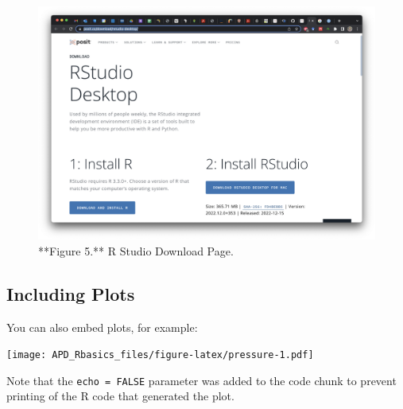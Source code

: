 \documentclass[
]{article}
\begin{document}
\begin{figure}

{\centering \includegraphics{images/R_studio-DL} 

}

\caption{**Figure 5.** R Studio Download Page.}\label{fig:sceenshot of R Studio Download page}
\end{figure}

\hypertarget{including-plots}{%
\subsection{Including Plots}\label{including-plots}}

You can also embed plots, for example:

\texttt{[image: APD\_Rbasics\_files/figure-latex/pressure-1.pdf]}

Note that the \texttt{echo\ =\ FALSE} parameter was added to the code
chunk to prevent printing of the R code that generated the plot.
\end{document}
